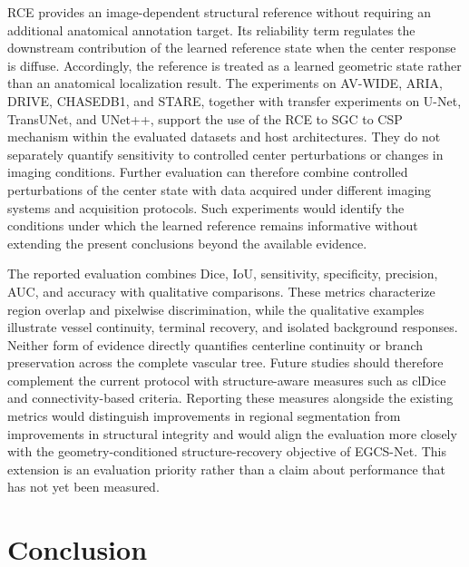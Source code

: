 \documentclass[a4paper,fleqn]{cas-sc}
\begin{document}
RCE provides an image-dependent structural reference without requiring an additional anatomical annotation target.
Its reliability term regulates the downstream contribution of the learned reference state when the center response is diffuse.
Accordingly, the reference is treated as a learned geometric state rather than an anatomical localization result.
The experiments on AV-WIDE, ARIA, DRIVE, CHASEDB1, and STARE, together with transfer experiments on U-Net, TransUNet, and UNet++, support the use of the RCE to SGC to CSP mechanism within the evaluated datasets and host architectures.
They do not separately quantify sensitivity to controlled center perturbations or changes in imaging conditions.
Further evaluation can therefore combine controlled perturbations of the center state with data acquired under different imaging systems and acquisition protocols.
Such experiments would identify the conditions under which the learned reference remains informative without extending the present conclusions beyond the available evidence.

The reported evaluation combines Dice, IoU, sensitivity, specificity, precision, AUC, and accuracy with qualitative comparisons.
These metrics characterize region overlap and pixelwise discrimination, while the qualitative examples illustrate vessel continuity, terminal recovery, and isolated background responses.
Neither form of evidence directly quantifies centerline continuity or branch preservation across the complete vascular tree.
Future studies should therefore complement the current protocol with structure-aware measures such as clDice~\cite{shit2021cldice} and connectivity-based criteria.
Reporting these measures alongside the existing metrics would distinguish improvements in regional segmentation from improvements in structural integrity and would align the evaluation more closely with the geometry-conditioned structure-recovery objective of EGCS-Net.
This extension is an evaluation priority rather than a claim about performance that has not yet been measured.

\section{Conclusion}
\end{document}
